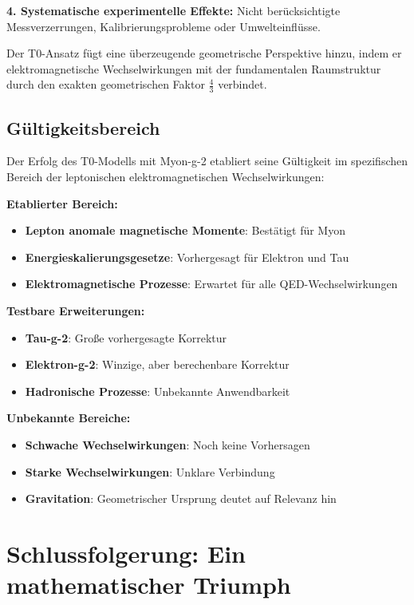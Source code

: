 \documentclass[12pt,a4paper]{report}
\begin{document}
	\textbf{4. Systematische experimentelle Effekte:}
	Nicht berücksichtigte Messverzerrungen, Kalibrierungsprobleme oder Umwelteinflüsse.
	
	Der T0-Ansatz fügt eine überzeugende geometrische Perspektive hinzu, indem er elektromagnetische Wechselwirkungen mit der fundamentalen Raumstruktur durch den exakten geometrischen Faktor $\frac{4}{3}$ verbindet.
	
	\subsection{Gültigkeitsbereich}
	\label{subsec:scope_validity}
	
	Der Erfolg des T0-Modells mit Myon-g-2 etabliert seine Gültigkeit im spezifischen Bereich der leptonischen elektromagnetischen Wechselwirkungen:
	
	\textbf{Etablierter Bereich:}
	\begin{itemize}
		\item \textbf{Lepton anomale magnetische Momente}: Bestätigt für Myon
		\item \textbf{Energieskalierungsgesetze}: Vorhergesagt für Elektron und Tau
		\item \textbf{Elektromagnetische Prozesse}: Erwartet für alle QED-Wechselwirkungen
	\end{itemize}
	
	\textbf{Testbare Erweiterungen:}
	\begin{itemize}
		\item \textbf{Tau-g-2}: Große vorhergesagte Korrektur
		\item \textbf{Elektron-g-2}: Winzige, aber berechenbare Korrektur
		\item \textbf{Hadronische Prozesse}: Unbekannte Anwendbarkeit
	\end{itemize}
	
	\textbf{Unbekannte Bereiche:}
	\begin{itemize}
		\item \textbf{Schwache Wechselwirkungen}: Noch keine Vorhersagen
		\item \textbf{Starke Wechselwirkungen}: Unklare Verbindung
		\item \textbf{Gravitation}: Geometrischer Ursprung deutet auf Relevanz hin
	\end{itemize}
	
	\section{Schlussfolgerung: Ein mathematischer Triumph}
	\label{sec:conclusion}
	
\end{document}
